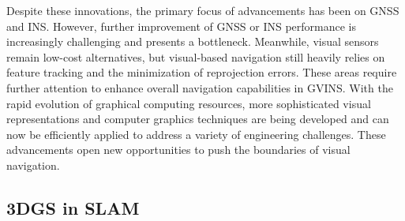 Despite these innovations, the primary focus of advancements has been on GNSS and INS. However, further improvement of GNSS or INS performance is increasingly challenging and presents a bottleneck. Meanwhile, visual sensors remain low-cost alternatives, but visual-based navigation still heavily relies on feature tracking and the minimization of reprojection errors. These areas require further attention to enhance overall navigation capabilities in GVINS. With the rapid evolution of graphical computing resources, more sophisticated visual representations and computer graphics techniques are being developed and can now be efficiently applied to address a variety of engineering challenges. These advancements open new opportunities to push the boundaries of visual navigation.      





\subsection{3DGS in SLAM}


